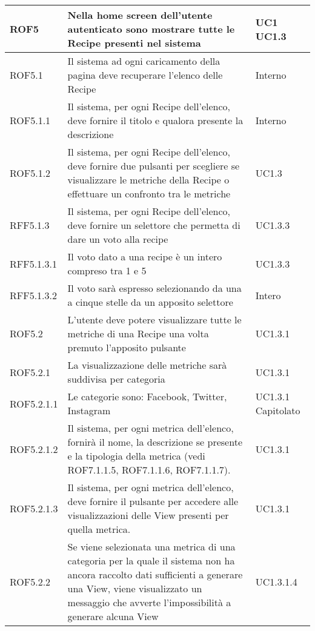 \begin{center}
\begin{longtable}{| p{2.5cm} | p{8cm} | p{2cm} |}
		\hline
		ROF5  &  Nella home screen dell'utente autenticato sono mostrare tutte le Recipe presenti nel sistema & UC1 \newline UC1.3 \\
		\hline
		ROF5.1  & Il sistema ad ogni caricamento della pagina deve recuperare l'elenco delle Recipe  &  Interno \\
		\hline
		ROF5.1.1  & Il sistema, per ogni Recipe dell'elenco, deve fornire il titolo e qualora presente la descrizione  &  Interno \\
		\hline
		ROF5.1.2  & Il sistema, per ogni Recipe dell'elenco, deve fornire due pulsanti per scegliere se visualizzare le metriche della Recipe o effettuare un confronto tra le metriche &  UC1.3 \\
		\hline
		RFF5.1.3  & Il sistema, per ogni Recipe dell'elenco, deve fornire un selettore che permetta di dare un voto alla recipe &  UC1.3.3 \\
		\hline
		RFF5.1.3.1  & Il voto dato a una recipe è un intero compreso tra 1 e 5 &  UC1.3.3 \\
		\hline
		RFF5.1.3.2  & Il voto sarà espresso selezionando da una a cinque stelle da un apposito selettore &  Intero \\
		\hline
		ROF5.2  &  L'utente deve potere visualizzare tutte le metriche di una Recipe una volta premuto l'apposito pulsante  &  UC1.3.1 \\
		\hline
		ROF5.2.1  &  La visualizzazione delle metriche sarà suddivisa per categoria  &  UC1.3.1 \\
		\hline
		ROF5.2.1.1  &  Le categorie sono: Facebook, Twitter, Instagram &  UC1.3.1 \newline Capitolato \\
		\hline
		ROF5.2.1.2  &  Il sistema, per ogni metrica dell'elenco, fornirà il nome, la descrizione se presente e la tipologia della metrica (vedi ROF7.1.1.5, ROF7.1.1.6, ROF7.1.1.7). &  UC1.3.1 \\
		\hline
		ROF5.2.1.3  &  Il sistema, per ogni metrica dell'elenco, deve fornire il pulsante per accedere alle visualizzazioni delle View presenti per quella metrica. &  UC1.3.1 \\
		\hline
		ROF5.2.2 & Se viene selezionata una metrica di una categoria per la quale il sistema non ha ancora raccolto dati sufficienti a generare una View, viene visualizzato un messaggio che avverte l'impossibilità a generare alcuna View &  UC1.3.1.4  \\
		\hline





\end{longtable}
\end{center}
